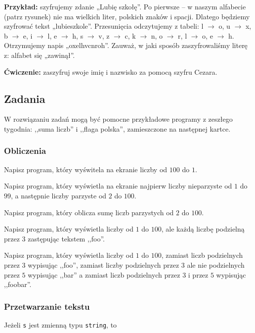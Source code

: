 \documentclass[a4paper, 10pt, pdftex, dvipsnames]{scrartcl}
\newcounter{zad}
\newcounter{pkt}
\newcommand{\zad}{\vspace{4mm}\noindent\setcounter{pkt}{0}\stepcounter{zad}{\bf \thezad.} }
\begin{document}
\vspace{2mm}\noindent
{\bf Przykład:} szyfrujemy zdanie „Lubię szkołę”. Po pierwsze – w naszym alfabecie (patrz rysunek) nie ma wielkich liter, polskich znaków i spacji. Dlatego będziemy szyfrować tekst „lubieszkole”. Przesunięcia odczytujemy z tabeli: l $\rightarrow$ o, u $\rightarrow$ x, b $\rightarrow$ e, i $\rightarrow$ l, e $\rightarrow$ h, s $\rightarrow$ v, z $\rightarrow$ c, k $\rightarrow$ n, o $\rightarrow$ r, l $\rightarrow$ o, e $\rightarrow$ h. Otrzymujemy napis „oxelhvcnroh”.
Zauważ, w jaki sposób zaszyfrowaliśmy literę z: alfabet się „zawinął”.

\vspace{2mm}\noindent
{\bf Ćwiczenie:} zaszyfruj swoje imię i nazwisko za pomocą szyfru Cezara.

\subsection*{Zadania}

W rozwiązaniu zadań mogą być pomocne przykładowe programy z zeszłego tygodnia: ,,suma liczb'' i ,,flaga polska'', zamieszczone na następnej kartce.

\subsubsection*{Obliczenia}

\zad Napisz program, który wyświtela na ekranie liczby od $100$ do $1$.

\zad Napisz program, który wyświetla na ekranie najpierw liczby nieparzyste od $1$ do $99$, a następnie liczby parzyste od $2$ do $100$.

\zad Napisz program, który oblicza sumę liczb parzystych od $2$ do $100$.

\zad Napisz program, który wyświetla liczby od $1$ do $100$, ale każdą liczbę podzielną przez $3$ zastępując tekstem ,,foo''.

\zad Napisz program, który wyświetla liczby od $1$ do $100$, zamiast liczb podzielnych przez $3$ wypisując ,,foo'', zamiast liczby podzielnych przez $3$ ale nie podzielnych przez $5$ wypisując ,,bar'' a zamiast liczb podzielnych przez $3$ i przez $5$ wypisując ,,foobar''.

\subsubsection*{Przetwarzanie tekstu}

Jeżeli {\tt s} jest zmienną typu {\tt string}, to
\end{document}
